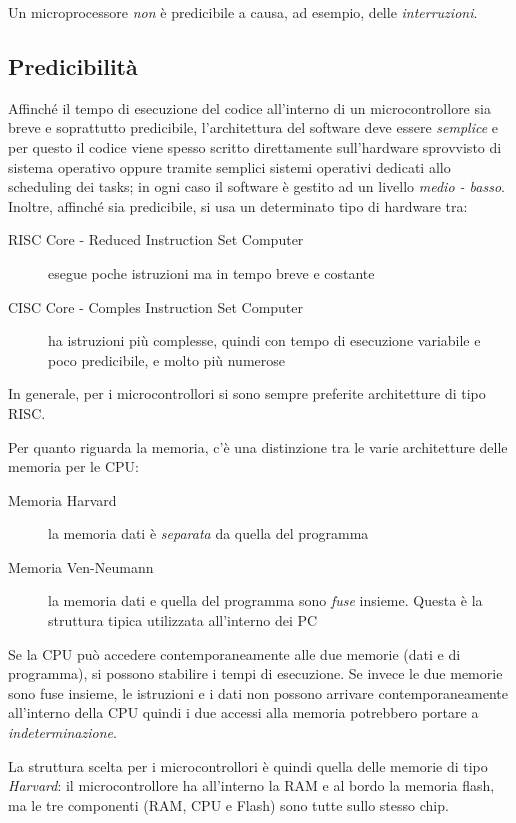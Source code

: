 \documentclass[12pt, a4paper]{report}
\begin{document}
Un microprocessore \textit{non} è predicibile a causa, ad esempio, delle \textit{interruzioni}.

\subsection{Predicibilità}
Affinché il tempo di esecuzione del codice all'interno di un microcontrollore sia breve e soprattutto predicibile, l'architettura  del software deve essere \textit{semplice} e per questo il codice viene spesso scritto direttamente sull'hardware sprovvisto di sistema operativo oppure tramite semplici sistemi operativi dedicati allo scheduling dei tasks; in ogni caso il software è gestito ad un livello \textit{medio - basso}. Inoltre, affinché sia predicibile, si usa un determinato tipo di hardware tra:
\begin{description}
    \item[RISC Core - Reduced Instruction Set Computer] esegue poche istruzioni ma in tempo breve e costante
    \item[CISC Core - Comples Instruction Set Computer] ha istruzioni più complesse, quindi con tempo di esecuzione variabile e poco predicibile, e molto più numerose
\end{description}
In generale, per i microcontrollori si sono sempre preferite architetture di tipo RISC.

Per quanto riguarda la memoria, c'è una distinzione tra le varie architetture delle memoria per le CPU:
\begin{description}
    \item[Memoria Harvard] la memoria dati è \textit{separata} da quella del programma
    \item[Memoria Ven-Neumann] la memoria dati e quella del programma sono \textit{fuse} insieme. Questa è la struttura tipica utilizzata all'interno dei PC
\end{description}
Se la CPU può accedere contemporaneamente alle due memorie (dati e di programma), si possono stabilire i tempi di esecuzione. Se invece le due memorie sono fuse insieme, le istruzioni e i dati non possono arrivare contemporaneamente all'interno della CPU quindi i due accessi alla memoria potrebbero portare a \textit{indeterminazione}.

La struttura scelta per i microcontrollori è quindi quella delle memorie di tipo \textit{Harvard}: il microcontrollore ha all'interno la RAM e al bordo la memoria flash, ma le tre componenti (RAM, CPU e Flash) sono tutte sullo stesso chip.
\end{document}
